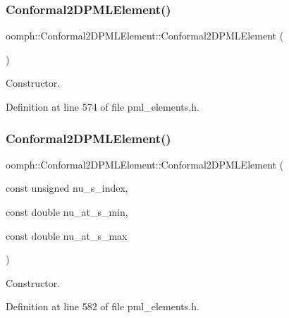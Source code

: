 \subsubsection{\texorpdfstring{Conformal2\+D\+P\+M\+L\+Element()}{Conformal2DPMLElement()}\hspace{0.1cm}{\footnotesize\ttfamily [1/2]}}
{\footnotesize\ttfamily oomph\+::\+Conformal2\+D\+P\+M\+L\+Element\+::\+Conformal2\+D\+P\+M\+L\+Element (\begin{DoxyParamCaption}{ }\end{DoxyParamCaption})\hspace{0.3cm}{\ttfamily [inline]}}



Constructor. 



Definition at line 574 of file pml\+\_\+elements.\+h.

\mbox{\label{classoomph_1_1Conformal2DPMLElement_a90de10011a8fb7062707d5c028a22d50}} 
\subsubsection{\texorpdfstring{Conformal2\+D\+P\+M\+L\+Element()}{Conformal2DPMLElement()}\hspace{0.1cm}{\footnotesize\ttfamily [2/2]}}
{\footnotesize\ttfamily oomph\+::\+Conformal2\+D\+P\+M\+L\+Element\+::\+Conformal2\+D\+P\+M\+L\+Element (\begin{DoxyParamCaption}\item[{const unsigned}]{nu\+\_\+s\+\_\+index,  }\item[{const double}]{nu\+\_\+at\+\_\+s\+\_\+min,  }\item[{const double}]{nu\+\_\+at\+\_\+s\+\_\+max }\end{DoxyParamCaption})\hspace{0.3cm}{\ttfamily [inline]}}



Constructor. 



Definition at line 582 of file pml\+\_\+elements.\+h.



